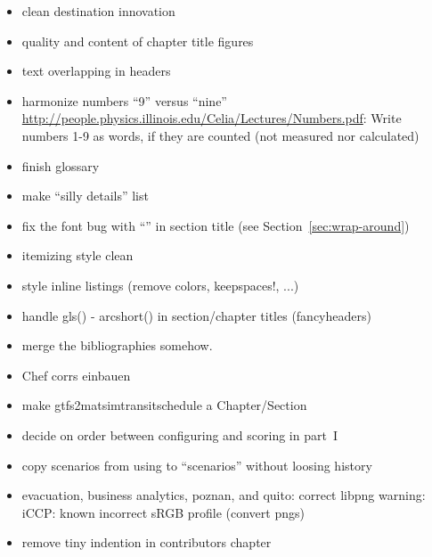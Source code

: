 \begin{itemize}\styleItemize

\item clean destination innovation

\item quality and content of chapter title figures

\item text overlapping in headers

\item harmonize numbers ``9'' versus ``nine'' \url{http://people.physics.illinois.edu/Celia/Lectures/Numbers.pdf}: Write numbers 1-9 as words, if they are counted (not measured nor calculated)

\item finish glossary

\item make ``silly details'' list

\item fix the font bug with ``'' in section title (see \eg Section~\ref{sec:wrap-around})

\item itemizing style clean

\item style inline listings (remove colors, keepspaces!, ...)

\item handle gls() - arcshort() in section/chapter titles (fancyheaders)

\item merge the bibliographies somehow.

\item Chef corrs einbauen

\item make gtfs2matsimtransitschedule a Chapter/Section

\item decide on order between configuring and scoring in part~I

\item copy scenarios from using to ``scenarios'' without loosing history

\item evacuation, business analytics, poznan, and quito: correct libpng warning: iCCP: known incorrect sRGB profile (convert pngs)

\item remove tiny indention in contributors chapter

\end{itemize}

